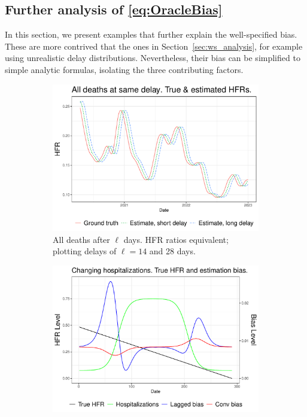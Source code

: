 \documentclass{article}
\begin{document}
\subsection{Further analysis of \eqref{eq:OracleBias}}
\label{apx:analysis}

In this section, we present examples that further explain the well-specified bias. These are more contrived that the ones in Section~\ref{sec:ws_analysis}, for example using unrealistic delay distributions. Nevertheless, their bias can be simplified to simple analytic formulas, isolating the three contributing factors.

\begin{figure}
     \centering
     \begin{subfigure}[b]{0.45\linewidth}
         \centering
         \includegraphics[width=\linewidth]{Figures/Simulated/sim_onehot.pdf}
         \caption{All deaths after $\ell$ days. HFR ratios equivalent; plotting delays of $\ell=14$ and 28 days.}
         \label{fig:onehot}
     \end{subfigure}
     \hfill
     \begin{subfigure}[b]{0.45\linewidth}
         \centering
         \includegraphics[width=\linewidth]{Figures/Simulated/sim_chging_primary.pdf}

\end{subfigure}
\end{figure}
\end{document}
